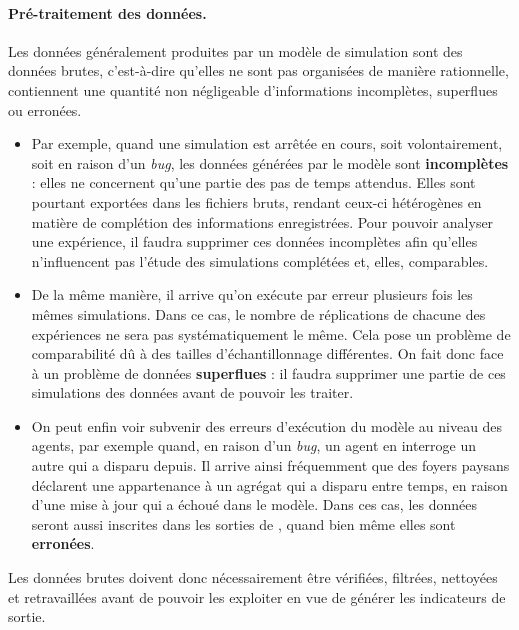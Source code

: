 \paragraph{Pré-traitement des données.}
Les données généralement produites par un modèle de simulation sont des données \og brutes\fg{}, c'est-à-dire qu'elles ne sont pas organisées de manière rationnelle, contiennent une quantité non négligeable d'informations incomplètes, superflues ou erronées.
\begin{itemize}
	\item Par exemple, quand une simulation est arrêtée en cours, soit volontairement, soit en raison d'un \textit{bug}, les données générées par le modèle sont \textbf{incomplètes} : elles ne concernent qu'une partie des pas de temps attendus.
	Elles sont pourtant exportées dans les fichiers bruts, rendant ceux-ci hétérogènes en matière de complétion des informations enregistrées.
	Pour pouvoir analyser une expérience, il faudra supprimer ces données incomplètes afin qu'elles n'influencent pas l'étude des simulations complétées et, elles, comparables.
	\item De la même manière, il arrive qu'on exécute par erreur plusieurs fois les mêmes simulations.
	Dans ce cas, le nombre de réplications de chacune des expériences ne sera pas systématiquement le même.
	Cela pose un problème de comparabilité dû à des tailles d'échantillonnage différentes.
	On fait donc face à un problème de données \textbf{superflues} : il faudra supprimer une partie de ces simulations des données avant de pouvoir les traiter.
	\item On peut enfin voir subvenir des erreurs d'exécution du modèle au niveau des agents, par exemple quand, en raison d'un \textit{bug}, un agent en interroge un autre qui a disparu depuis.
	Il arrive ainsi fréquemment que des foyers paysans déclarent une appartenance à un agrégat qui a disparu entre temps, en raison d'une mise à jour qui a échoué dans le modèle.
	Dans ces cas, les données seront aussi inscrites dans les sorties de \simfeodal{}, quand bien même elles sont \textbf{erronées}.
\end{itemize}

Les données brutes doivent donc nécessairement être vérifiées, filtrées, nettoyées et retravaillées avant de pouvoir les exploiter en vue de générer les indicateurs de sortie.

